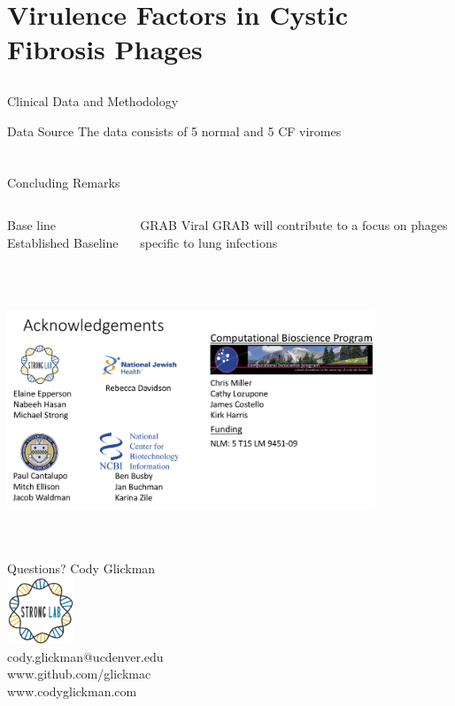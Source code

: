 \documentclass[11pt]{beamer}
\begin{document}
	

\section{Virulence Factors in Cystic Fibrosis Phages}
\subsection{}

	
	\begin{frame}{Clinical Data and Methodology}
	\begin{block}{Data Source}
	The data consists of 5 normal and 5 CF viromes
	\end{block}
	\end{frame}

	
	
	
\section{}

	\begin{frame}{Concluding Remarks}
	\begin{columns}
	\begin{block}{Base line}
	Established Baseline
	\end{block}
	\begin{block}{GRAB}
	Viral GRAB will contribute to a focus on phages specific to lung infections
	\end{block}
	
	\end{columns}
	
	\end{frame}
	
	
	
	
	\begin{frame}{}
	\vspace{1cm}
	{\includegraphics[height=8cm, width=11cm]{Acknowledgements.png} }
	\end{frame}
	
	
	\begin{frame}{Questions?}
	\center
	Cody Glickman \\ \includegraphics[height=2cm, width=2cm]{lablogo.png} \\ cody.glickman@ucdenver.edu \\ \alert{www.github.com/glickmac} \\ www.codyglickman.com
	\end{frame}
	
\end{document}
